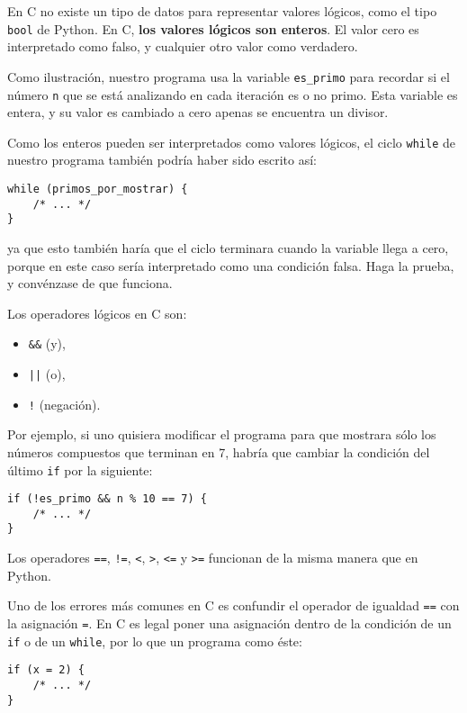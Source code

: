 En C no existe un tipo de datos para representar valores lógicos, como
el tipo \lstinline!bool! de Python. En C, \textbf{los valores lógicos
son enteros}. El valor cero es interpretado como falso, y cualquier otro
valor como verdadero.

Como ilustración, nuestro programa usa la variable \lstinline!es_primo!
para recordar si el número \lstinline!n! que se está analizando en cada
iteración es o no primo. Esta variable es entera, y su valor es cambiado
a cero apenas se encuentra un divisor.

Como los enteros pueden ser interpretados como valores lógicos, el ciclo
\lstinline!while! de nuestro programa también podría haber sido escrito
así:

\begin{lstlisting}
while (primos_por_mostrar) {
    /* ... */
}
\end{lstlisting}

ya que esto también haría que el ciclo terminara cuando la variable
llega a cero, porque en este caso sería interpretado como una condición
falsa. Haga la prueba, y convénzase de que funciona.

Los operadores lógicos en C son:

\begin{itemize}
\item
  \lstinline!&&! (y),
\item
  \lstinline!||! (o),
\item
  \lstinline"!" (negación).
\end{itemize}

Por ejemplo, si uno quisiera modificar el programa para que mostrara
sólo los números compuestos que terminan en 7, habría que cambiar la
condición del último \lstinline!if! por la siguiente:

\begin{lstlisting}
if (!es_primo && n % 10 == 7) {
    /* ... */
}
\end{lstlisting}

Los operadores \lstinline!==!, \lstinline"!=", \lstinline!<!,
\lstinline!>!, \lstinline!<=! y \lstinline!>=! funcionan de la misma
manera que en Python.

Uno de los errores más comunes en C es confundir el operador de igualdad
\lstinline!==! con la asignación \lstinline!=!. En C es legal poner una
asignación dentro de la condición de un \lstinline!if! o de un
\lstinline!while!, por lo que un programa como éste:

\begin{lstlisting}
if (x = 2) {
    /* ... */
}
\end{lstlisting}

